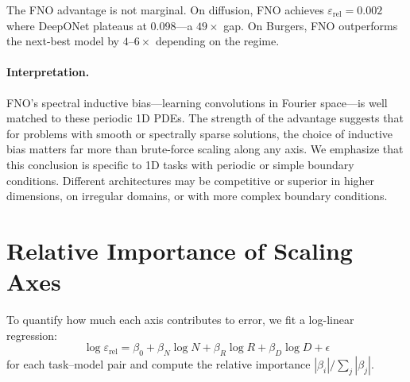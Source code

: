 \documentclass[11pt]{article}
\newcommand{\relLtwo}{\varepsilon_{\mathrm{rel}}}
\begin{document}
The FNO advantage is not marginal. On diffusion, FNO achieves
$\relLtwo = 0.002$ where DeepONet plateaus at 0.098---a $49\times$
gap. On Burgers, FNO outperforms the next-best model by
$4$--$6\times$ depending on the regime.

\paragraph{Interpretation.}
FNO's spectral inductive bias---learning convolutions in Fourier
space---is well matched to these periodic 1D PDEs. The strength of
the advantage suggests that for problems with smooth or spectrally
sparse solutions, the choice of inductive bias matters far more than
brute-force scaling along any axis.
We emphasize that this conclusion is specific to 1D tasks with
periodic or simple boundary conditions. Different architectures may
be competitive or superior in higher dimensions, on irregular
domains, or with more complex boundary conditions.


\section{Relative Importance of Scaling Axes}
\label{sec:importance}

To quantify how much each axis contributes to error, we fit a
log-linear regression:
\begin{equation}
\label{eq:log-linear}
\log \relLtwo = \beta_0 + \beta_N \log N + \beta_R \log R
  + \beta_D \log D + \epsilon
\end{equation}
for each task--model pair and compute the relative importance
$|\beta_i| / \sum_j |\beta_j|$.
\end{document}
